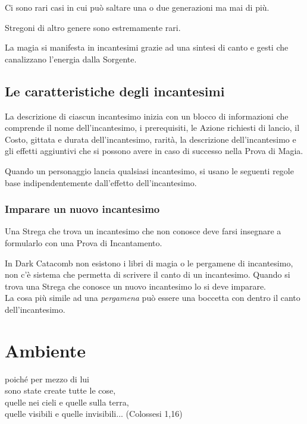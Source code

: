 \documentclass[a4paper,twoside,openany]{book}
\begin{document}
\begin{multicols}{2}
Ci sono rari casi in cui può saltare una o due generazioni ma mai di più.

Stregoni di altro genere sono estremamente rari.

La magia si manifesta in incantesimi grazie ad una sintesi di canto e gesti che canalizzano l'energia dalla Sorgente.

\subsection{Le caratteristiche degli incantesimi}\label{caratteristicheincantesimi}

La descrizione di ciascun incantesimo inizia con un blocco di informazioni che comprende il nome dell'incantesimo, i prerequisiti, le Azione richiesti di lancio, il Costo, gittata e durata dell'incantesimo, rarità, la descrizione dell'incantesimo e gli effetti aggiuntivi che si possono avere in caso di successo nella Prova di Magia.

Quando un personaggio lancia qualsiasi incantesimo, si usano le seguenti regole base indipendentemente dall'effetto dell'incantesimo.

\subsubsection{Imparare un nuovo incantesimo}

Una Strega che trova un incantesimo che non conosce deve farsi insegnare a formularlo con una Prova di Incantamento.

\begin{narratore}
In Dark Catacomb non esistono i libri di magia o le pergamene di incantesimo, non c'è sistema che permetta di scrivere il canto di un incantesimo. Quando si trova una Strega che conosce un nuovo incantesimo lo si deve imparare.\\
La cosa più simile ad una \textit{pergamena} può essere una boccetta con dentro il canto dell'incantesimo.
\end{narratore}

\pagebreak

\section{Ambiente}

\label{ambiente}
\begin{changemargin}{0.3cm}{0.3cm}\begin{enfasi}{
poiché per mezzo di lui\\
sono state create tutte le cose,\\
quelle nei cieli e quelle sulla terra,\\
quelle visibili e quelle invisibili... (Colossesi 1,16)\\\medskip

}
\end{enfasi}
\end{changemargin}
\end{multicols}
\end{document}
